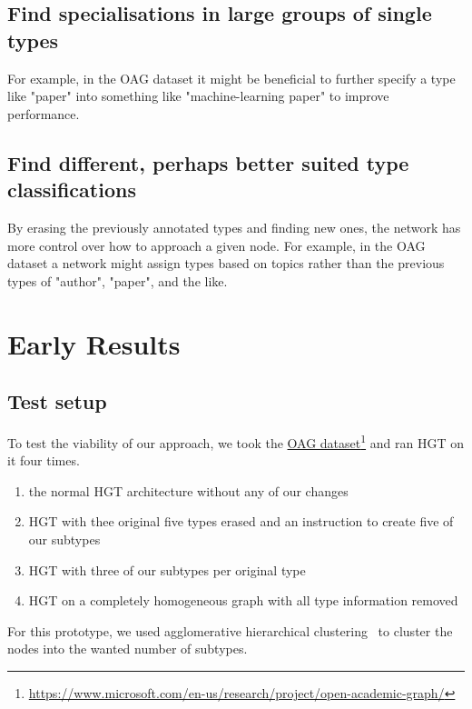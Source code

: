 \subsection{Find specialisations in large groups of single types} 
For example, in the OAG dataset it might be beneficial to further specify a type like "paper" into something like "machine-learning paper" to improve performance.

\subsection{Find different, perhaps better suited type classifications} 
By erasing the previously annotated types and finding new ones, the network has more control over how to approach a given node.
For example, in the OAG dataset a network might assign types based on topics rather than the previous types of "author", "paper",
and the like.



\section{Early Results}


\subsection{Test setup}


To test the viability of our approach, we took the \href{https://www.microsoft.com/en-us/research/project/open-academic-graph/}{OAG dataset}\footnote{\url{https://www.microsoft.com/en-us/research/project/open-academic-graph/}} and ran HGT on it four times.

\begin{enumerate}
\item the normal HGT architecture without any of our changes

\item HGT with thee original five types erased and an instruction to create five of our subtypes

\item HGT with three of our subtypes per original type

\item HGT on a completely homogeneous graph with all type information removed
\end{enumerate}

For this prototype, we used agglomerative hierarchical clustering~\cite{ward_hierarchical_1963} to cluster the nodes into the wanted number of subtypes.

